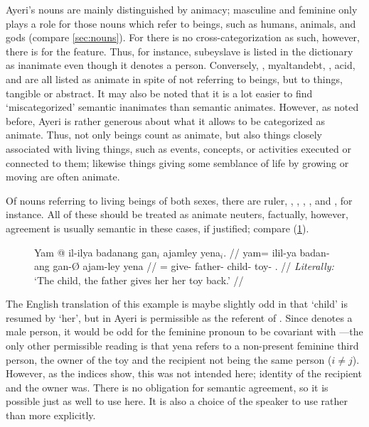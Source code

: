 Ayeri's nouns are mainly distinguished by animacy; masculine and feminine only
plays a role for those nouns which refer to beings, such as humans, animals,
and gods (compare \autoref{sec:nouns}). For \Gend{} there is no
cross-categorization as such, however, there is for the \Anim{} feature. Thus,
for instance,  {subey}{slave} is listed in the dictionary as
inanimate even though it denotes a person. Conversely,
,  {myaltan}{debt},
,  {acid}, and
 are all listed as animate in spite of not referring to
beings, but to things, tangible or abstract. It may also be noted that it is a
lot easier to find `miscategorized' semantic inanimates than semantic animates.
However, as noted before, Ayeri is rather generous about what it allows to be
categorized as animate. Thus, not only beings count as animate, but also things
closely associated with living things, such as events, concepts, or activities
executed or connected to them; likewise things giving some semblance of life
by growing or moving are often animate.

Of nouns referring to living beings of both sexes, there are 
{ruler}, , ,
, , and
, for instance. All of these should be treated as
animate neuters, factually, however, agreement is usually semantic in these
cases, if justified; compare (\ref{ex:childsem}).

\begin{figure}
\ex\label{ex:childsem}\begingl
	\gla Yam @ il-ilya badanang gan$_i$ ajamley yena$_i$. //
	\glb yam= il\til{}il-ya badan-ang gan-Ø ajam-ley yena //
	\glc \DatT{}= \Iter{}\til{}give-\TsgM{} father-\Aarg{} child-\Top{}
		toy-\PargI{} \TsgF{}.\Gen{} //
	\glft \textit{Literally:} `The child, the father gives her her toy 
		back.' //
\endgl\xe
\end{figure}

The English translation of this example is maybe slightly odd in that `child' is
resumed by `her', but in Ayeri  is permissible as the
referent of . Since  denotes a
male person, it would be odd for the feminine pronoun to be covariant with
---the only other permissible reading is that 
{yena} refers to a non-present feminine third person, the owner of the toy and
the recipient not being the same person ($i \neq j$). However, as the indices
show, this was not intended here; identity of the recipient and the owner was.
There is no obligation for semantic agreement, so it is possible just as well
to use  here. It is also a choice of the speaker to use
 rather than  more explicitly.

